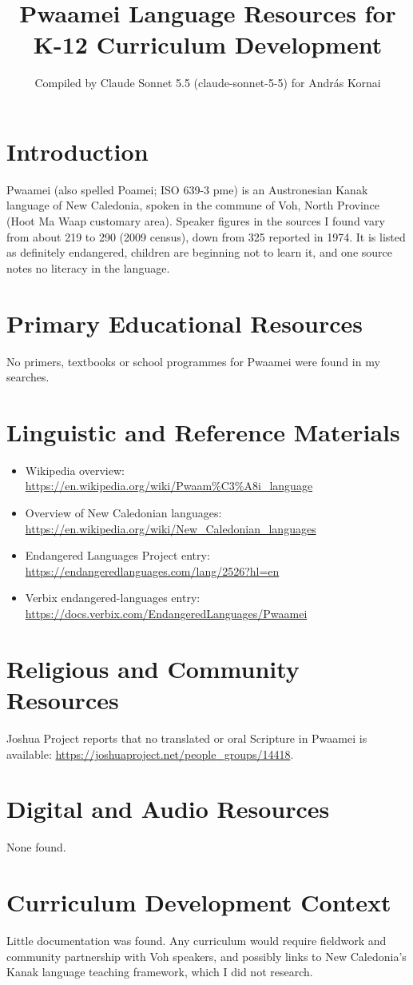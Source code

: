 \documentclass[12pt]{article}
\title{Pwaamei Language Resources for K-12 Curriculum Development}
\author{Compiled by Claude Sonnet 5.5 (claude-sonnet-5-5) for Andr\'as Kornai}
\date{}
\begin{document}
\maketitle

\section{Introduction}
Pwaamei (also spelled Poamei; ISO 639-3 pme) is an Austronesian Kanak language of New Caledonia, spoken in the commune of Voh, North Province (Hoot Ma Waap customary area). Speaker figures in the sources I found vary from about 219 to 290 (2009 census), down from 325 reported in 1974. It is listed as definitely endangered, children are beginning not to learn it, and one source notes no literacy in the language.

\section{Primary Educational Resources}
No primers, textbooks or school programmes for Pwaamei were found in my searches.

\section{Linguistic and Reference Materials}
\begin{itemize}
\item Wikipedia overview: \url{https://en.wikipedia.org/wiki/Pwaam%C3%A8i_language}
\item Overview of New Caledonian languages: \url{https://en.wikipedia.org/wiki/New_Caledonian_languages}
\item Endangered Languages Project entry: \url{https://endangeredlanguages.com/lang/2526?hl=en}
\item Verbix endangered-languages entry: \url{https://docs.verbix.com/EndangeredLanguages/Pwaamei}
\end{itemize}

\section{Religious and Community Resources}
Joshua Project reports that no translated or oral Scripture in Pwaamei is available: \url{https://joshuaproject.net/people_groups/14418}.

\section{Digital and Audio Resources}
None found.

\section{Curriculum Development Context}
Little documentation was found. Any curriculum would require fieldwork and community partnership with Voh speakers, and possibly links to New Caledonia's Kanak language teaching framework, which I did not research.
\end{document}
